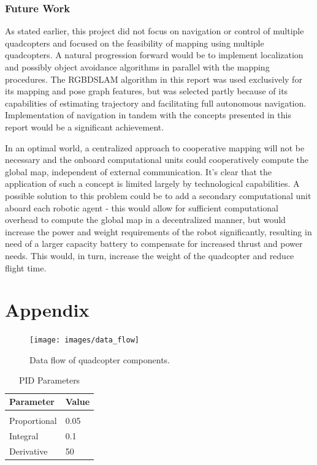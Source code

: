 \documentclass[letterpaper, oneside, 10pt]{report}
\begin{document}
\subsection{Future Work}

As stated earlier, this project did not focus on navigation or control of multiple quadcopters and focused on the feasibility of mapping using multiple quadcopters. A natural progression forward would be to implement localization and possibly object avoidance algorithms in parallel with the mapping procedures. The RGBDSLAM algorithm in this report was used exclusively for its mapping and pose graph features, but was selected partly because of its capabilities of estimating trajectory and facilitating full autonomous navigation. Implementation of navigation in tandem with the concepts presented in this report would be a significant achievement.

In an optimal world, a centralized approach to cooperative mapping will not be necessary and the onboard computational units could cooperatively compute the global map, independent of external communication. It's clear that the application of such a concept is limited largely by technological capabilities. A possible solution to this problem could be to add a secondary computational unit aboard each robotic agent - this would allow for sufficient computational overhead to compute the global map in a decentralized manner, but would increase the power and weight requirements of the robot significantly, resulting in need of a larger capacity battery to compensate for increased thrust and power needs. This would, in turn, increase the weight of the quadcopter and reduce flight time.

\chapter{Appendix}

\begin{figure}[h!]
 \caption{Data flow of quadcopter components.}
 \centering
   \texttt{[image: images/data\_flow]}
 \label{fig: data flow.}
\end{figure}

\begin{table}[h!]
  \centering
  \caption{PID Parameters}
  \vspace{2mm}
  \begin{tabular}{l l}
    \hline \hline
    \vspace{-2mm}
    Parameter & \multicolumn{1}{l}{Value} \\ [1ex]
    \hline
    & \\
    Proportional & 0.05 \\
    Integral & 0.1 \\
    Derivative & 50 \\
  \end{tabular}
\end{table}
\end{document}
